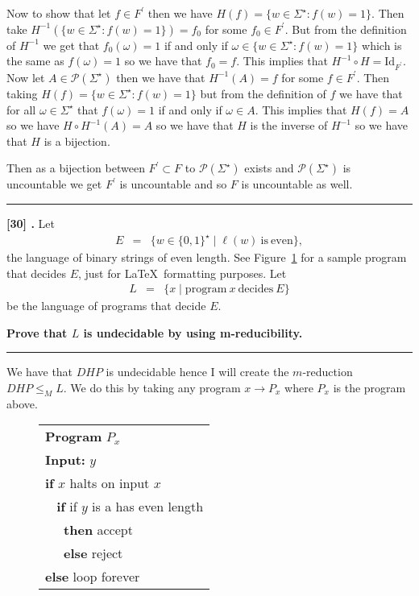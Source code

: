 \documentclass[11pt,twoside]{article}
\newcounter{problem}
\newcommand{\problem}[1]{%
\refstepcounter{problem}\noindent\textbf{[#1] \arabic{problem}.}}
\newcommand{\solution}{\bigskip\hrule\bigskip}
\newcommand{\problembreak}{\bigskip\hrule\bigskip}
\begin{document}
Now to show that let $f\in F^\prime$ then we have $H(f)=\{w\in \Sigma^\star: f(w)=1\}$. Then take $H^{-1}(\{w\in \Sigma^\star: f(w)=1\})=f_0$ for some $f_0\in F^\prime$. But from the definition of $H^{-1}$ we get that $f_0(\omega)=1$ if and only if $\omega \in \{w\in \Sigma^\star: f(w)=1\}$ which is the same as $f(\omega)=1$ so we have that $f_0=f$. This implies that $H^{-1}\circ H=\text{Id}_{F^\prime}$. Now let $A\in \mathcal P(\Sigma^\star)$ then we have that $H^{-1}(A)=f$ for some $f\in F^\prime$. Then taking $H(f)=\{w\in \Sigma ^\star: f(w)=1\}$ but from the definition of $f$ we have that for all $\omega \in \Sigma^\star$ that $f(\omega)=1$ if and only if $\omega \in A$. This implies that $H(f)=A$ so we have $H\circ H^{-1}(A)=A$ so we have that $H$ is the inverse of $H^{-1}$ so we have that $H$ is a bijection. 

Then as a bijection between $F^\prime\subset F$ to $\mathcal{P}(\Sigma^\star)$ exists and $\mathcal{P}(\Sigma^\star)$ is uncountable we get $F^\prime$ is uncountable and so $F$ is uncountable as well.



\problembreak

\problem{30}
Let
\begin{eqnarray*}
E
& = &
\{w\in\{0,1\}^\star\mid \ell(w) \mathrm{\ is\ even}\},
\end{eqnarray*}
the language of binary strings of even length.
See Figure~\ref{figure:sampleprogram}
for a sample program that decides $E$,
just for \LaTeX\ formatting purposes.
Let
\begin{eqnarray*}
L
& = &
\{x\mid \mathrm{program\ } x \mathrm{\ decides\ } E\}
\end{eqnarray*}
be the language of programs that decide $E$.

{\bfseries
Prove that $L$ is undecidable by using m-reducibility.
}

\solution

We have that $DHP$ is undecidable hence I will create the $m$-reduction $DHP\leq_M L$. We do this by taking any program $x\to P_x$ where $P_x$ is the program above.


\begin{figure}[tp]
    \begin{tabular}{|l|}
    \hline
    \textbf{Program} $P_x$ \\
    \textbf{Input:} $y$ \\
    \textbf{if} $x$ halts on input $x$ \\
    $\;\;$ \textbf{       if} if $y$ is a has even length
     \\
    $\;\;\;\;$ \textbf{       then} accept \\
     $\;\;\;\;$ \textbf{       else} reject \\
    \textbf{else} loop forever \\
    \hline
    \end{tabular}
    \label{figure:sampleprogram}
\end{figure}
\end{document}
